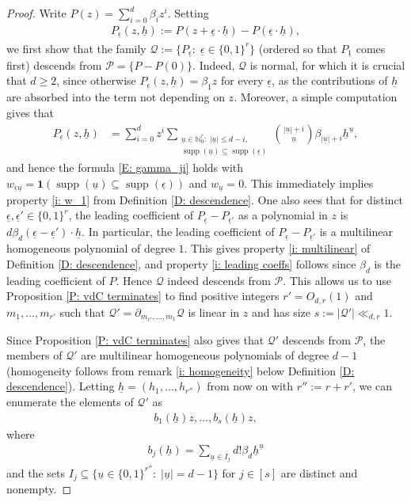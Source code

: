 \documentclass[11pt]{amsart}
\theoremstyle{definition}
\newcommand{\N}{{\mathbb N}}
\newcommand{\CP}{{\mathcal P}}
\newcommand{\CQ}{{\mathcal Q}}
\newcommand{\uh}{{\underline{h}}}
\newcommand{\uu}{{\underline{u}}}
\newcommand{\ueps}{{\underline{\epsilon}}}
\DeclareMathOperator{\supp}{supp}
\begin{document}
\begin{proof}

    Write $P(z) =  \sum_{i=0}^d \beta_i z^i$. Setting 
    \begin{align*}
        P_\ueps(z,\uh) := P(z+\ueps\cdot\uh) - P(\ueps\cdot\uh),
    \end{align*}
    we first show that the family 
    $\CQ := \{P_\ueps:\; \ueps\in\{0,1\}^r\}$ 
    (ordered so that $P_{\underline{1}}$ comes first) descends from $\CP=\{P - P(0)\}$. Indeed, $\CQ$ is normal, for which it is crucial that $d\geq 2$, since otherwise $P_\ueps(z, \uh) = \beta_1 z$ for every $\ueps$, as the contributions of $\uh$ are absorbed into the term not depending on $z$. 
    Moreover, a simple computation gives that
    \begin{align*}
        P_\ueps(z,\uh) &= \sum_{i=0}^d z^i \sum_{\substack{\uu\in\N_0^r:\; |\uu|\leq d-i,\\ \supp(\uu)\subseteq\supp(\ueps)}}{{|\uu|+i}\choose{\uu}}\beta_{|\uu|+i} \uh^\uu, 
    \end{align*}
    and hence the formula \eqref{E: gamma_ji} holds with $w_{\ueps\uu} = \mathbf{1}(\supp(\uu)\subseteq\supp(\ueps))$ and $w_\uu = 0$. This immediately implies property \eqref{i: w_1} from Definition \ref{D: descendence}. One also sees that for distinct $\ueps,\ueps'\in\{0,1\}^r$, the leading coefficient of 
    $P_\ueps-P_{\ueps'}$ as a polynomial in $z$ is $d \beta_d (\ueps-\ueps')\cdot\uh$. In particular, the leading coefficient of $P_\ueps-P_{\ueps'}$ is a multilinear homogeneous polynomial of degree $1$. This gives property \eqref{i: multilinear} of Definition \ref{D: descendence}, and property \eqref{i: leading coeffs} follows since $\beta_d$ is the leading coefficient of $P$. 
    Hence $\CQ$ indeed descends from $\CP$. This allows us to use Proposition \ref{P: vdC terminates} to find positive integers $r'=O_{d,r}(1)$ and $m_1, \ldots, m_{r'}$ such that $\CQ'=\partial_{m_{r'}, \ldots, m_1}\CQ$ is linear in $z$ and has size $s:=|\CQ'|\ll_{d,r} 1$.
    
    Since Proposition \ref{P: vdC terminates} also gives that $\CQ'$ descends from $\CP$, the members of $\CQ'$ are multilinear homogeneous polynomials of degree $d-1$ (homogeneity follows from remark \eqref{i: homogeneity} below Definition \ref{D: descendence}). Letting $\uh = (h_1, \ldots, h_{r''})$ from now on with  $r'':=r+r'$, we can enumerate the elements of $\CQ'$ as
    \begin{align*}
    b_1(\uh)z, \ldots, b_s(\uh)z,
    \end{align*}
     where
    \begin{align*}
    b_j(\uh) = \sum_{\uu\in I_j}d! \beta_d \uh^\uu
    \end{align*}
    and the sets $I_j\subseteq \{\uu\in\{0,1\}^{r''}:\; |\uu| = d-1\}$ for $j\in[s]$ are distinct and nonempty.


\end{proof}
\end{document}
